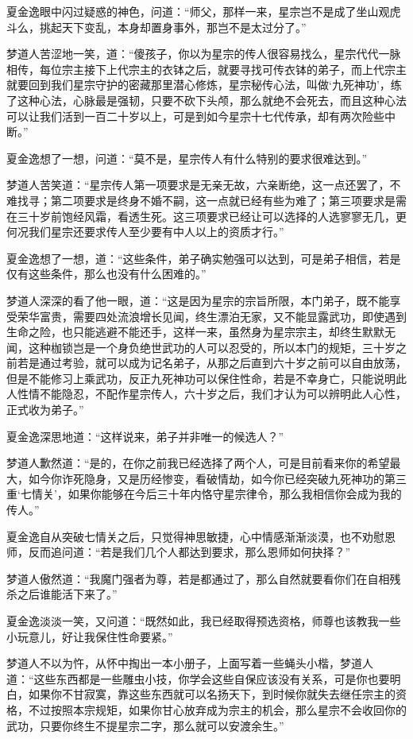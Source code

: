夏金逸眼中闪过疑惑的神色，问道：“师父，那样一来，星宗岂不是成了坐山观虎斗么，挑起天下变乱，本身却置身事外，那岂不是太过分了。”

梦道人苦涩地一笑，道：“傻孩子，你以为星宗的传人很容易找么，星宗代代一脉相传，每位宗主接下上代宗主的衣钵之后，就要寻找可传衣钵的弟子，而上代宗主就要回到我们星宗守护的密藏那里潜心修炼，星宗秘传心法，叫做‘九死神功’，练了这种心法，心脉最是强韧，只要不砍下头颅，那么就绝不会死去，而且这种心法可以让我们活到一百二十岁以上，可是到如今星宗十七代传承，却有两次险些中断。”

夏金逸想了一想，问道：“莫不是，星宗传人有什么特别的要求很难达到。”

梦道人苦笑道：“星宗传人第一项要求是无亲无故，六亲断绝，这一点还罢了，不难找寻；第二项要求是终身不婚不嗣，这一点就已经有些为难了；第三项要求是需在三十岁前饱经风霜，看透生死。这三项要求已经让可以选择的人选寥寥无几，更何况我们星宗还要求传人至少要有中人以上的资质才行。”

夏金逸想了一想，道：“这些条件，弟子确实勉强可以达到，可是弟子相信，若是仅有这些条件，那么也没有什么困难的。”

梦道人深深的看了他一眼，道：“这是因为星宗的宗旨所限，本门弟子，既不能享受荣华富贵，需要四处流浪增长见闻，终生漂泊无家，又不能显露武功，即使遇到生命之险，也只能逃避不能还手，这样一来，虽然身为星宗宗主，却终生默默无闻，这种枷锁岂是一个身负绝世武功的人可以忍受的，所以本门的规矩，三十岁之前若是通过考验，就可以成为记名弟子，从那之后直到六十岁之前可以自由放荡，但是不能修习上乘武功，反正九死神功可以保住性命，若是不幸身亡，只能说明此人性情不能隐忍，不配作星宗传人，六十岁之后，我们才认为可以辨明此人心性，正式收为弟子。”

夏金逸深思地道：“这样说来，弟子并非唯一的候选人？”

梦道人歉然道：“是的，在你之前我已经选择了两个人，可是目前看来你的希望最大，如今你诈死隐身，又是历经惨变，看破情劫，如今你已经突破九死神功的第三重‘七情关’，如果你能够在今后三十年内恪守星宗律令，那么我相信你会成为我的传人。”

夏金逸自从突破七情关之后，只觉得神思敏捷，心中情感渐渐淡漠，也不劝慰恩师，反而追问道：“若是我们几个人都达到要求，那么恩师如何抉择？”

梦道人傲然道：“我魔门强者为尊，若是都通过了，那么自然就要看你们在自相残杀之后谁能活下来了。”

夏金逸淡淡一笑，又问道：“既然如此，我已经取得预选资格，师尊也该教我一些小玩意儿，好让我保住性命要紧。”

梦道人不以为忤，从怀中掏出一本小册子，上面写着一些蝇头小楷，梦道人道：“这些东西都是一些雕虫小技，你学会这些自保应该没有关系，可是你也要明白，如果你不甘寂寞，靠这些东西就可以名扬天下，到时候你就失去继任宗主的资格，不过按照本宗规矩，如果你甘心放弃成为宗主的机会，那么星宗不会收回你的武功，只要你终生不提星宗二字，那么就可以安渡余生。”


